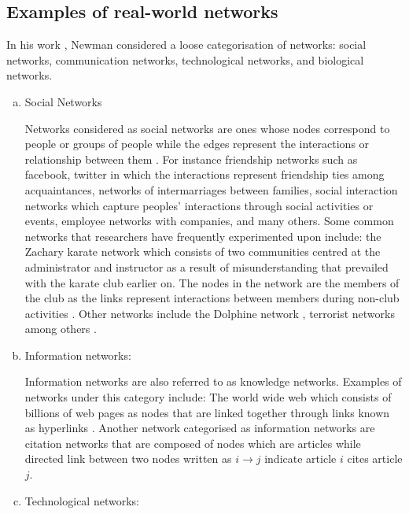 \documentclass[10pt,a4paper]{article}
\theoremstyle{plain}
\theoremstyle{definition}
\newtheorem{rem}[subsection]{Remark}
\begin{document}

\subsection{Examples of real-world networks}
In his work \citep{newman2003structure}, Newman considered a loose categorisation of networks: social networks, communication networks, technological networks, and biological networks.
\begin{enumerate}[a.]
	\item Social Networks
	
	Networks considered as social networks are ones whose nodes correspond to people or groups of people while the edges represent the interactions or relationship between them \citep{jackson2010social}. For instance friendship networks such as facebook, twitter in which the interactions represent friendship ties among acquaintances, networks of intermarriages between families, social interaction networks which capture peoples' interactions through social activities or events, employee networks with companies, and many others.
	Some common networks that researchers have frequently experimented upon include: the Zachary karate network which consists of two communities centred at the administrator and instructor as a result of misunderstanding that prevailed with the karate club earlier on. The nodes in the network are the members of the club as the links represent interactions between members during non-club activities \citep{zachary1977information}. Other networks include the Dolphine network \citep{williams1993abundance}, terrorist networks \citep{magouirk2008connecting} among others .
	
	\item Information networks: 
	
	Information networks are also referred to as knowledge networks. Examples of networks under this category include: 
	The world wide web which consists of billions of web pages as nodes that are linked together through links known as hyperlinks \citep{huberman2001laws}.
	Another network categorised as information networks are citation networks that are composed of nodes which are articles while directed link between two nodes written as $i\longrightarrow j$ indicate article $i$ cites article $j$.
	\item Technological networks:
	

\end{enumerate}
\end{document}
